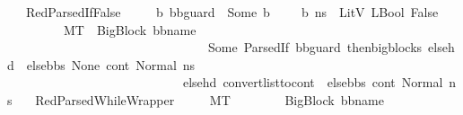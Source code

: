\begin{isabellebody}
\isanewline
\ \ {\isacharbar}{\kern0pt}\ RedParsedIfFalse{\isacharcolon}{\kern0pt}\ \isanewline
\ \ \ \ {\isachardoublequoteopen}{\isasymlbrakk}{\isasymAnd}b{\isachardot}{\kern0pt}\ bb{\isacharunderscore}{\kern0pt}guard\ {\isacharequal}{\kern0pt}\ {\isacharparenleft}{\kern0pt}Some\ b{\isacharparenright}{\kern0pt}\ {\isasymLongrightarrow}\ \ {\isasymLambda}{\isacharcomma}{\kern0pt}{\isasymGamma}{\isacharcomma}{\kern0pt}{\isasymOmega}\ {\isasymturnstile}\ {\isasymlangle}b{\isacharcomma}{\kern0pt}\ n{\isacharunderscore}{\kern0pt}s{\isasymrangle}\ {\isasymDown}\ LitV\ {\isacharparenleft}{\kern0pt}LBool\ False{\isacharparenright}{\kern0pt}\ {\isasymrbrakk}\ \isanewline
\ \ \ \ \ \ \ \ {\isasymLongrightarrow}\ M{\isacharcomma}{\kern0pt}{\isasymLambda}{\isacharcomma}{\kern0pt}{\isasymGamma}{\isacharcomma}{\kern0pt}{\isasymOmega}{\isacharcomma}{\kern0pt}T\ {\isasymturnstile}\ {\isasymlangle}{\isacharparenleft}{\kern0pt}{\isacharparenleft}{\kern0pt}BigBlock\ bb{\isacharunderscore}{\kern0pt}name\ {\isacharbrackleft}{\kern0pt}{\isacharbrackright}{\kern0pt}\isanewline
\ \ \ \ \ \ \ \ \ \ \ \ \ \ \ \ \ \ \ \ \ \ \ \ \ \ \ \ \ \ \ \ {\isacharparenleft}{\kern0pt}Some\ {\isacharparenleft}{\kern0pt}ParsedIf\ bb{\isacharunderscore}{\kern0pt}guard\ thenbigblocks\ {\isacharparenleft}{\kern0pt}else{\isacharunderscore}{\kern0pt}hd\ {\isacharhash}{\kern0pt}\ else{\isacharunderscore}{\kern0pt}bbs{\isacharparenright}{\kern0pt}{\isacharparenright}{\kern0pt}{\isacharparenright}{\kern0pt}\ None{\isacharparenright}{\kern0pt}{\isacharcomma}{\kern0pt}\ cont{}{\isacharcomma}{\kern0pt}\ Normal\ n{\isacharunderscore}{\kern0pt}s{\isacharparenright}{\kern0pt}{\isasymrangle}\ {\isasymlongrightarrow}\isanewline
\ \ \ \ \ \ \ \ \ \ \ \ \ \ \ \ \ \ \ \ \ \ \ \ \ \ \ \ {\isacharparenleft}{\kern0pt}else{\isacharunderscore}{\kern0pt}hd{\isacharcomma}{\kern0pt}\ {\isacharparenleft}{\kern0pt}convert{\isacharunderscore}{\kern0pt}list{\isacharunderscore}{\kern0pt}to{\isacharunderscore}{\kern0pt}cont\ {\isacharparenleft}{\kern0pt}\ else{\isacharunderscore}{\kern0pt}bbs{\isacharparenright}{\kern0pt}\ cont{}{\isacharparenright}{\kern0pt}{\isacharcomma}{\kern0pt}\ Normal\ n{\isacharunderscore}{\kern0pt}s{\isacharparenright}{\kern0pt}{\isachardoublequoteclose}\isanewline
\isanewline
\ \ {\isacharbar}{\kern0pt}\ RedParsedWhileWrapper{\isacharcolon}{\kern0pt}\ \isanewline
\ \ \ \ {\isachardoublequoteopen}M{\isacharcomma}{\kern0pt}{\isasymLambda}{\isacharcomma}{\kern0pt}{\isasymGamma}{\isacharcomma}{\kern0pt}{\isasymOmega}{\isacharcomma}{\kern0pt}T\ {\isasymturnstile}\ \isanewline
\ \ \ \ \ \ {\isasymlangle}{\isacharparenleft}{\kern0pt}{\isacharparenleft}{\kern0pt}BigBlock\ bb{\isacharunderscore}{\kern0pt}name\ {\isacharbrackleft}{\kern0pt}{\isacharbrackright}{\kern0pt}\ \isanewline

\end{isabellebody}
